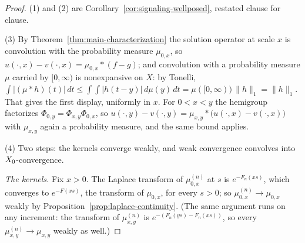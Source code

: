 \begin{proof}
(1) and (2) are Corollary~\ref{cor:signaling-wellposed}, restated clause for clause.

(3) By Theorem~\ref{thm:main-characterization} the solution operator at scale $x$ is convolution
with the probability measure $\mu_{0,x}$, so $u(\cdot,x) - v(\cdot,x) = \mu_{0,x}*(f-g)$;
and convolution with a probability measure $\mu$ carried by $[0,\infty)$ is nonexpansive on
$X$: by Tonelli,
$\int |(\mu * h)(t)|\,dt \le \int\!\!\int |h(t-y)|\,d\mu(y)\,dt = \mu([0,\infty))\,\|h\|_1
= \|h\|_1$. That gives the first display, uniformly in $x$. For $0 < x < y$ the hemigroup
factorizes $\Phi_{0,y} = \Phi_{x,y}\Phi_{0,x}$, so
$u(\cdot,y) - v(\cdot,y) = \mu_{x,y} * \bigl(u(\cdot,x) - v(\cdot,x)\bigr)$ with $\mu_{x,y}$
again a probability measure, and the same bound applies.

(4) Two steps: the kernels converge weakly, and weak convergence convolves into
$X_0$-convergence.

\emph{The kernels.} Fix $x > 0$. The Laplace transform of $\mu^{(n)}_{0,x}$ at $s$ is
$e^{-F_n(xs)}$, which converges to $e^{-F(xs)}$, the transform of $\mu_{0,x}$, for every
$s > 0$; so $\mu^{(n)}_{0,x} \to \mu_{0,x}$ weakly by Proposition~\ref{prop:laplace-continuity}. (The
same argument runs on any increment: the transform of $\mu^{(n)}_{x,y}$ is
$e^{-(F_n(ys) - F_n(xs))}$, so every $\mu^{(n)}_{x,y} \to \mu_{x,y}$ weakly as well.)


\end{proof}
